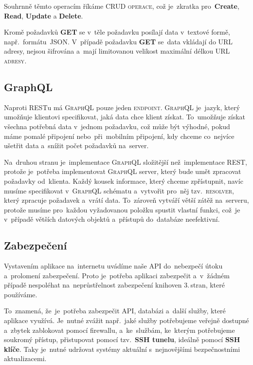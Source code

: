 \documentclass[14pt,a4paper]{article}
\begin{document}
        Souhrnně těmto operacím říkáme \textsc{CRUD operace}, což je~zkratka pro~\textbf{Create}, \textbf{Read}, \textbf{Update} a \textbf{Delete}.

        Kromě požadavků \textbf{GET} se v~těle požadavku posílají data v~textové formě, např.~formátu~JSON. 
        V~případě požadavku \textbf{GET} se~data vkládají do URL adresy, nejsou šifrována a~mají limitovanou velikost maximální délkou \textsc{URL adresy}.

        \subsection{GraphQL}
        Naproti \textsc{REST}u má \textsc{GraphQL} pouze jeden \textsc{endpoint}. \textsc{GraphQL} je~jazyk, který umožňuje klientovi specifikovat, jaká data chce klient získat. To~umožňuje získat všechna potřebná data v~jednom požadavku, což může být výhodné, pokud máme pomalé připojení nebo~při~mobilním připojení, kdy chceme co~nejvíce ušetřit data a~snížit počet požadavků na~server.

        Na~druhou stranu je~implementace \textsc{GraphQL} složitější než~implementace \textsc{REST}, protože je~potřeba implementovat \textsc{GraphQL} server, který bude umět zpracovat požadavky od~klienta. Každý kousek informace, který chceme zpřístupnit, navíc musíme specifikovat v~\textsc{GraphQL} schématu a~vytvořit pro~něj tzv.~\textsc{resolver}, který zpracuje požadavek a~vrátí data. To~zároveň vytváří větší zátěž na~serveru, protože musíme pro~každou vyžadovanou položku spustit vlastní funkci, což~je v~případě větších datových objektů a~přístupů do~databáze neefektivní.

        \subsection{Zabezpečení}
        Vystavením aplikace na~internetu uvádíme naše API do~nebezpečí útoku a~prolomení zabezpečení. Proto je~potřeba aplikaci zabezpečit a~v~žádném případě nespoléhat na~neprůstřelnost zabezpečení knihoven 3.\,stran, které používáme.
        
        To~znamená, že~je~potřeba zabezpečit API, databázi a~další služby, které aplikace využívá. Je~nutné zvážit např.~jaké služby potřebujeme veřejně dostupné a~zbytek zablokovat pomocí firewallu, a~ke~službám, ke~kterým potřebujeme soukromý přístup, přistupovat pomocí tzv.~\textbf{SSH tunelu}, ideálně pomocí \textbf{SSH klíče}. Taky je~nutné udržovat systémy aktuální s~nejnovějšími bezpečnostními aktualizacemi.
        
\end{document}

